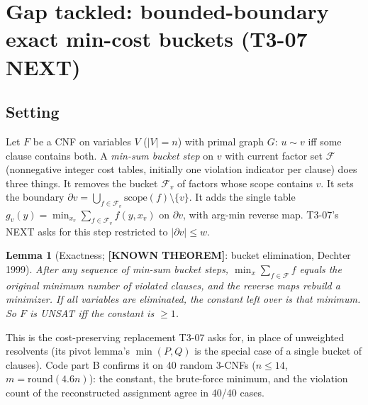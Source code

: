 \documentclass[11pt]{article}
\newtheorem{lemma}{Lemma}
\theoremstyle{definition}
\theoremstyle{remark}
\newcommand{\lab}[1]{\textbf{[#1]}}
\begin{document}
\section{Gap tackled: bounded-boundary exact min-cost buckets (T3-07 NEXT)}
\subsection{Setting}
Let $F$ be a CNF on variables $V$ ($|V|=n$) with primal graph $G$: $u\sim v$ iff some clause
contains both. A \emph{min-sum bucket step} on $v$ with current factor set $\mathcal F$
(nonnegative integer cost tables, initially one violation indicator per clause) does
three things. It removes the bucket $\mathcal F_v$ of factors whose scope contains $v$.
It sets the boundary $\partial v=\bigcup_{f\in\mathcal F_v}\mathrm{scope}(f)\setminus\{v\}$.
It adds the single table $g_v(y)=\min_{x_v}\sum_{f\in\mathcal F_v}f(y,x_v)$ on $\partial v$,
with arg-min reverse map. T3-07's NEXT asks for this step restricted to $|\partial v|\le w$.

\begin{lemma}[Exactness; \lab{KNOWN THEOREM}: bucket elimination, Dechter 1999]\label{lem:exact}
After any sequence of min-sum bucket steps, $\min_x\sum_{f\in\mathcal F}f$ equals the
original minimum number of violated clauses, and the reverse maps rebuild a minimizer. If
all variables are eliminated, the constant left over is that minimum. So $F$ is UNSAT iff
the constant is $\ge1$.
\end{lemma}
\noindent This is the cost-preserving replacement T3-07 asks for, in place of unweighted
resolvents (its pivot lemma's $\min(P,Q)$ is the special case of a single bucket of
clauses). Code part B confirms it on 40 random 3-CNFs ($n\le14$, $m=\mathrm{round}(4.6n)$):
the constant, the brute-force minimum, and the violation count of the reconstructed
assignment agree in 40/40 cases.
\end{document}
